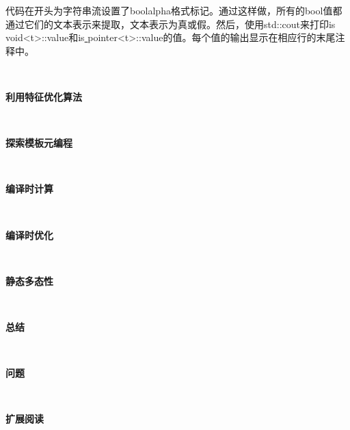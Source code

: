 代码在开头为字符串流设置了boolalpha格式标记。通过这样做，所有的bool值都通过它们的文本表示来提取，文本表示为真或假。然后，使用std::cout来打印is\underline{ }void<t>::value和is\underline{ }pointer<t>::value的值。每个值的输出显示在相应行的末尾注释中。 \par

\noindent\textbf{}\ \par
\textbf{利用特征优化算法} \ \par

\noindent\textbf{}\ \par
\textbf{探索模板元编程} \ \par

\noindent\textbf{}\ \par
\textbf{编译时计算} \ \par

\noindent\textbf{}\ \par
\textbf{编译时优化} \ \par

\noindent\textbf{}\ \par
\textbf{静态多态性} \ \par

\noindent\textbf{}\ \par
\textbf{总结} \ \par

\noindent\textbf{}\ \par
\textbf{问题} \ \par

\noindent\textbf{}\ \par
\textbf{扩展阅读} \ \par

\newpage